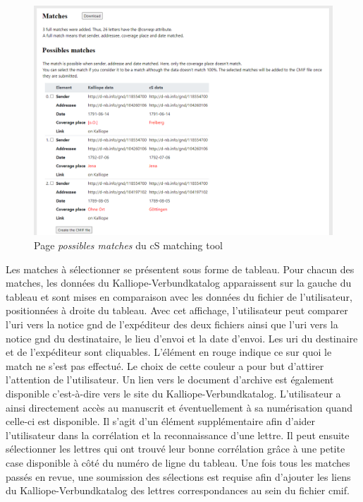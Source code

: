 \documentclass[a4paper, 12pt, twoside]{book}
\begin{document}
\begin{figure}[h!]
    \centering
         \includegraphics[width=15cm]{img/csMT_possiblematches.png}
         \caption{Page \textit{possibles matches} du cS matching tool}
         \vspace{-10pt}
\end{figure}
Les matches à sélectionner se présentent sous forme de tableau. Pour chacun des matches, les données du Kalliope-Verbundkatalog apparaissent sur la gauche du tableau et sont mises en comparaison avec les données du fichier de l'utilisateur, positionnées à droite du tableau. Avec cet affichage, l'utilisateur peut comparer l'\gls{uri} vers la notice \gls{gnd} de l'expéditeur des deux fichiers ainsi que l'\gls{uri} vers la notice \gls{gnd} du destinataire, le lieu d'envoi et la date d'envoi. Les \gls{uri} du destinaire et de l'expéditeur sont cliquables. L'élément en rouge indique ce sur quoi le match ne s'est pas effectué. Le choix de cette couleur a pour but d'attirer l'attention de l'utilisateur. Un lien vers le document d'archive est également disponible c'est-à-dire vers le site du Kalliope-Verbundkatalog. L'utilisateur a ainsi directement accès au manuscrit et éventuellement à sa numérisation quand celle-ci est disponible. Il s'agit d'un élément supplémentaire afin d'aider l'utilisateur dans la corrélation et la reconnaissance d'une lettre. Il peut ensuite sélectionner les lettres qui ont trouvé leur bonne corrélation grâce à une petite case disponible à côté du numéro de ligne du tableau. Une fois tous les matches passés en revue, une soumission des sélections est requise afin d'ajouter les liens du Kalliope-Verbundkatalog des lettres correspondances au sein du fichier \gls{cmif}. 
\end{document}
